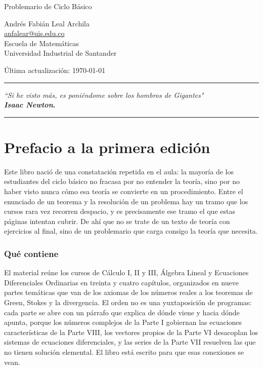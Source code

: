 \documentclass[12pt, fleqn, leqno]{book}
\theoremstyle{plain}
\theoremstyle{definition}
\let\originaladdcontentsline\addcontentsline
\renewcommand{\addcontentsline}[3]{%
  \shorthandoff{.}\shorthandoff{"}\shorthandoff{<}\shorthandoff{>}%
  \originaladdcontentsline{#1}{#2}{#3}%
}
\begin{document}
	\setlength{\headheight}{15pt}
\begin{titlepage}
  \centering
  \vspace*{2cm}
  {\LARGE Problemario de Ciclo Básico \par}
  \vspace{2cm}
  {\large Andrés Fabián Leal Archila\\ \url{anfalear@uis.edu.co}\\ Escuela de Matemáticas \\ Universidad Industrial de Santander \par}
  \vfill
 {\large Última actualización: \today \par}
 
  {\rule[0.1mm]{\textwidth}{0.5mm}
  \begin{flushright}
    \emph{``Si he visto más, es poniéndome sobre los hombros de Gigantes"}\\
    \textbf{\textit{Isaac Newton}.}
  \end{flushright}
  {\rule[0.1mm]{\textwidth}{0.5mm}}}
  \vspace*{2cm}
 
\end{titlepage}

\chapter*{Prefacio a la primera edición}

Este libro nació de una constatación repetida en el aula: la mayoría de los estudiantes del ciclo básico no fracasa por no entender la teoría, sino por no haber visto nunca cómo esa teoría se convierte en un procedimiento. Entre el enunciado de un teorema y la resolución de un problema hay un tramo que los cursos rara vez recorren despacio, y es precisamente ese tramo el que estas páginas intentan cubrir. De ahí que no se trate de un texto de teoría con ejercicios al final, sino de un problemario que carga consigo la teoría que necesita.

\subsection*{Qué contiene}

El material reúne los cursos de Cálculo I, II y III, Álgebra Lineal y Ecuaciones Diferenciales Ordinarias en treinta y cuatro capítulos, organizados en nueve partes temáticas que van de los axiomas de los números reales a los teoremas de Green, Stokes y la divergencia. El orden no es una yuxtaposición de programas: cada parte se abre con un párrafo que explica de dónde viene y hacia dónde apunta, porque los números complejos de la Parte I gobiernan las ecuaciones características de la Parte VIII, los vectores propios de la Parte VI desacoplan los sistemas de ecuaciones diferenciales, y las series de la Parte VII resuelven las que no tienen solución elemental. El libro está escrito para que esas conexiones se vean.
\end{document}
